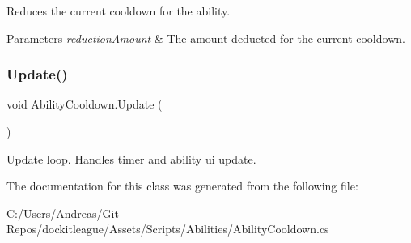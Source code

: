Reduces the current cooldown for the ability. 


\begin{DoxyParams}{Parameters}
{\em reduction\+Amount} & The amount deducted for the current cooldown.\\
\hline
\end{DoxyParams}
\hypertarget{class_ability_cooldown_a0a1223f783a3c342413172a5797fa597}{}\label{class_ability_cooldown_a0a1223f783a3c342413172a5797fa597} 
\subsubsection{\texorpdfstring{Update()}{Update()}}
{\footnotesize\ttfamily void Ability\+Cooldown.\+Update (\begin{DoxyParamCaption}{ }\end{DoxyParamCaption})}



Update loop. Handles timer and ability ui update. 



The documentation for this class was generated from the following file\+:\begin{DoxyCompactItemize}
\item 
C\+:/\+Users/\+Andreas/\+Git Repos/dockitleague/\+Assets/\+Scripts/\+Abilities/Ability\+Cooldown.\+cs\end{DoxyCompactItemize}

